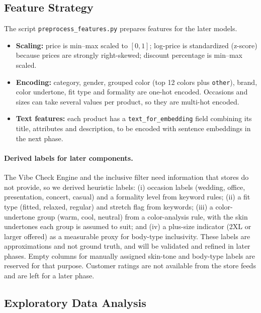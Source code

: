 \subsection{Feature Strategy}
The script \texttt{preprocess\_features.py} prepares features for the later models.
\begin{itemize}
  \item \textbf{Scaling:} price is min--max scaled to $[0,1]$; log-price is standardized (z-score) because prices are strongly right-skewed; discount percentage is min--max scaled.
  \item \textbf{Encoding:} category, gender, grouped color (top 12 colors plus \texttt{other}), brand, color undertone, fit type and formality are one-hot encoded. Occasions and sizes can take several values per product, so they are multi-hot encoded.
  \item \textbf{Text features:} each product has a \texttt{text\_for\_embedding} field combining its title, attributes and description, to be encoded with sentence embeddings in the next phase.
\end{itemize}

\paragraph{Derived labels for later components.} The Vibe Check Engine and the inclusive filter need information that stores do not provide, so we derived heuristic labels: (i) occasion labels (wedding, office, presentation, concert, casual) and a formality level from keyword rules; (ii) a fit type (fitted, relaxed, regular) and stretch flag from keywords; (iii) a color-undertone group (warm, cool, neutral) from a color-analysis rule, with the skin undertones each group is assumed to suit; and (iv) a plus-size indicator (2XL or larger offered) as a measurable proxy for body-type inclusivity. These labels are approximations and not ground truth, and will be validated and refined in later phases. Empty columns for manually assigned skin-tone and body-type labels are reserved for that purpose. Customer ratings are not available from the store feeds and are left for a later phase.

\subsection{Exploratory Data Analysis}

